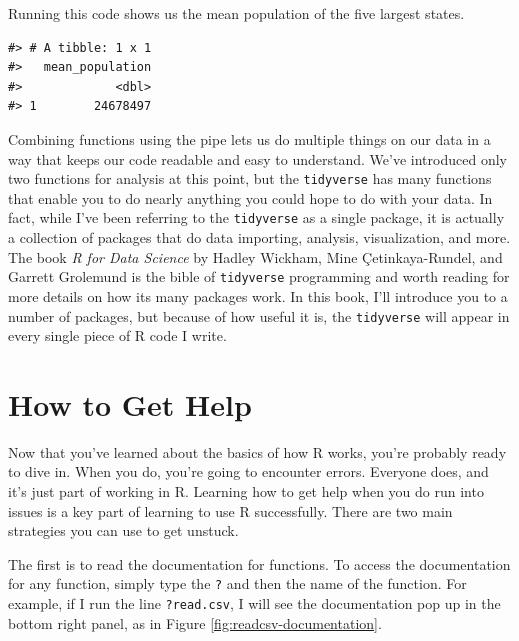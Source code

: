 \documentclass[
]{book}
\begin{document}
Running this code shows us the mean population of the five largest states.

\begin{verbatim}
#> # A tibble: 1 x 1
#>   mean_population
#>             <dbl>
#> 1        24678497
\end{verbatim}

Combining functions using the pipe lets us do multiple things on our data in a way that keeps our code readable and easy to understand. We've introduced only two functions for analysis at this point, but the \texttt{tidyverse} has many functions that enable you to do nearly anything you could hope to do with your data. In fact, while I've been referring to the \texttt{tidyverse} as a single package, it is actually a collection of packages that do data importing, analysis, visualization, and more. The book \emph{R for Data Science} by Hadley Wickham, Mine Çetinkaya-Rundel, and Garrett Grolemund is the bible of \texttt{tidyverse} programming and worth reading for more details on how its many packages work. In this book, I'll introduce you to a number of packages, but because of how useful it is, the \texttt{tidyverse} will appear in every single piece of R code I write.

\hypertarget{how-to-get-help}{%
\section*{How to Get Help}\label{how-to-get-help}}

Now that you've learned about the basics of how R works, you're probably ready to dive in. When you do, you're going to encounter errors. Everyone does, and it's just part of working in R. Learning how to get help when you do run into issues is a key part of learning to use R successfully. There are two main strategies you can use to get unstuck.

The first is to read the documentation for functions. To access the documentation for any function, simply type the \texttt{?} and then the name of the function. For example, if I run the line \texttt{?read.csv}, I will see the documentation pop up in the bottom right panel, as in Figure \ref{fig:readcsv-documentation}.
\end{document}
